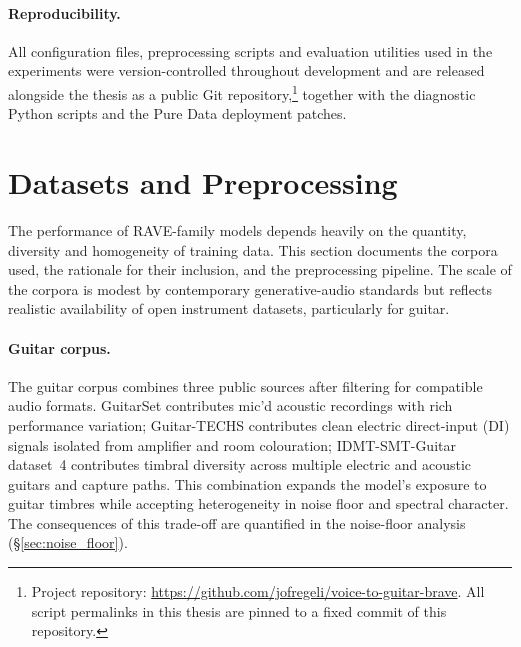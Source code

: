 \documentclass[a4paper,11pt,oneside,openany]{book}
\begin{document}
\paragraph{Reproducibility.} All configuration files, preprocessing scripts and evaluation utilities used in the experiments were version-controlled throughout development and are released alongside the thesis as a public Git repository,\footnote{Project repository: \url{https://github.com/jofregeli/voice-to-guitar-brave}. All script permalinks in this thesis are pinned to a fixed commit of this repository.} together with the diagnostic Python scripts and the Pure Data deployment patches.

\section{Datasets and Preprocessing}\label{sec:datasets_preprocessing}

The performance of RAVE-family models depends heavily on the quantity, diversity and homogeneity of training data. This section documents the corpora used, the rationale for their inclusion, and the preprocessing pipeline. The scale of the corpora is modest by contemporary generative-audio standards but reflects realistic availability of open instrument datasets, particularly for guitar.

\paragraph{Guitar corpus.} The guitar corpus combines three public sources after filtering for compatible audio formats. GuitarSet contributes mic'd acoustic recordings with rich performance variation; Guitar-TECHS contributes clean electric direct-input (DI) signals isolated from amplifier and room colouration; IDMT-SMT-Guitar dataset~4 contributes timbral diversity across multiple electric and acoustic guitars and capture paths. This combination expands the model's exposure to guitar timbres while accepting heterogeneity in noise floor and spectral character. The consequences of this trade-off are quantified in the noise-floor analysis (\S\ref{sec:noise_floor}).
\end{document}
